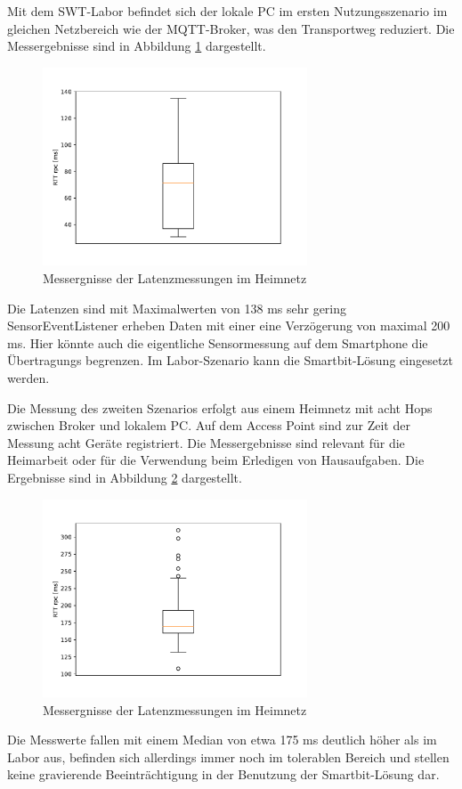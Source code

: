 \documentclass[11pt,a4paper]{report}
\begin{document}
Mit dem SWT-Labor befindet sich der lokale PC im ersten Nutzungsszenario im gleichen Netzbereich wie der MQTT-Broker, was den Transportweg reduziert.
Die Messergebnisse sind in Abbildung \ref{fig:measure_institute} dargestellt.
\begin{figure}[htbp]
  \centering
  \includegraphics[width=0.7\textwidth]{images/timing_institute.pdf}
  \caption{Messergnisse der Latenzmessungen im Heimnetz}
  \label{fig:measure_institute}
\end{figure}
Die Latenzen sind mit Maximalwerten von 138 ms sehr gering  
SensorEventListener erheben Daten mit einer eine Verzögerung von maximal 200 ms.
Hier könnte auch die eigentliche Sensormessung auf dem Smartphone die Übertragungs begrenzen.
Im Labor-Szenario kann die Smartbit-Lösung eingesetzt werden.

Die Messung des zweiten Szenarios erfolgt aus einem Heimnetz mit acht Hops zwischen Broker und lokalem PC. 
Auf dem Access Point sind zur Zeit der Messung acht Geräte registriert.
Die Messergebnisse sind relevant für die Heimarbeit oder für die Verwendung beim Erledigen von Hausaufgaben.
Die Ergebnisse sind in Abbildung \ref{fig:measure_home} dargestellt.
\begin{figure}[htbp]
  \centering
  \includegraphics[width=0.7\textwidth]{images/timing_at_home}
  \caption{Messergnisse der Latenzmessungen im Heimnetz}
  \label{fig:measure_home}
\end{figure}
Die Messwerte fallen mit einem Median von etwa 175 ms deutlich höher als im Labor aus, befinden sich allerdings immer noch im tolerablen Bereich und stellen keine gravierende Beeinträchtigung in der Benutzung der Smartbit-Lösung dar.
\end{document}
